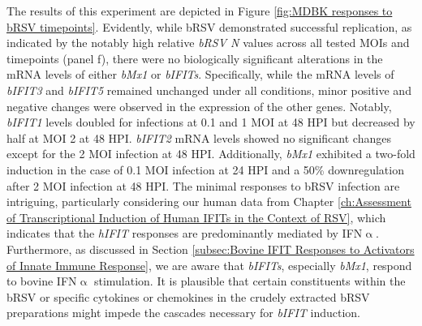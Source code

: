 The results of this experiment are depicted in Figure \ref{fig:MDBK responses to bRSV timepoints}. Evidently, while bRSV demonstrated successful replication, as indicated by the notably high relative \textit{bRSV N} values across all tested MOIs and timepoints (panel f), there were no biologically significant alterations in the mRNA levels of either \textit{bMx1} or \textit{bIFITs}. Specifically, while the mRNA levels of \textit{bIFIT3} and \textit{bIFIT5} remained unchanged under all conditions, minor positive and negative changes were observed in the expression of the other genes. Notably, \textit{bIFIT1} levels doubled for infections at 0.1 and 1 MOI at 48 HPI but decreased by half at MOI 2 at 48 HPI. \textit{bIFIT2} mRNA levels showed no significant changes except for the 2 MOI infection at 48 HPI. Additionally, \textit{bMx1} exhibited a two-fold induction in the case of 0.1 MOI infection at 24 HPI and a 50\% downregulation after 2 MOI infection at 48 HPI. The minimal responses to bRSV infection are intriguing, particularly considering our human data from Chapter \ref{ch:Assessment of Transcriptional Induction of Human IFITs in the Context of RSV}, which indicates that the \textit{hIFIT} responses are predominantly mediated by IFN$\upalpha$. Furthermore, as discussed in Section \ref{subsec:Bovine IFIT Responses to Activators of Innate Immune Response}, we are aware that \textit{bIFITs}, especially \textit{bMx1}, respond to bovine IFN$\upalpha$ stimulation. It is plausible that certain constituents within the bRSV or specific cytokines or chemokines in the crudely extracted bRSV preparations might impede the cascades necessary for \textit{bIFIT} induction.

